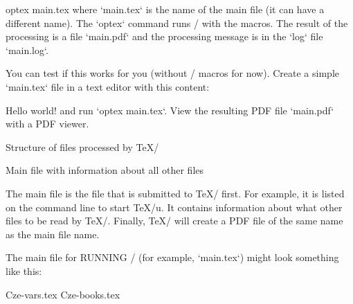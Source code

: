 \begtt
optex main.tex
\endtt
where `main.tex` is the name of the main file (it can have a different name). 
The `optex` command runs \LuaTeX/ with the \OpTeX macros. The result of the processing is a file 
`main.pdf` and the processing message is in the `log` file `main.log`.

You can test if this works for you (without \OpBible/ macros for now). Create a simple `main.tex` file in a text editor with this content:

\begtt
\fontfam[lm]
Hello world!
\bye
\endtt
and run `optex main.tex`. View the resulting PDF file `main.pdf` with a PDF viewer.


\sec Structure of files processed by \TeX/

\secc[main] Main file with information about all other files

The main file is the file that is submitted to \TeX/ first. For example, it is
listed on the command line to start \TeX/u. It contains information about what
other files to be read by \TeX/. Finally, \TeX/ will create a PDF file of the same
name as the main file name.

The main file for RUNNING \OpBible/ (for example, `main.tex`) might look something like this:

\begtt
\load[opbible] %
\enlang %

\def\tmark {BBE} %

 {Cze-vars.tex} %
 {Cze-books.tex} %

\def\txsfile {sources/Eng\tmark-\amark.txs} %
\def\fmtfile {formats/fmt-Eng\tmark-\amark.tex} %
\def\notesfile {notes/notes-\amark.tex} %
\def\introfile {others/intro-\amark.tex} %
\def\articlefile {others/articles-\amark.tex} %

\def\printedbooks {%
 Gen Exod Lev Num Deut Josh Judg Ruth 1Sam 2Sam 1Kgs 2Kgs 1Chr 2Chr Ezra Neh Esth Job Ps 
 Prov Eccl Song Isa Jer Lam Ezek Dan Hos Joel Amos Obad Jonah Mic Nah Hab Zeph Hag Zech Mal    
 Matt Mark Luke John Acts Rom 1Cor 2Cor Gal Eph Phil Col 1Thess 2Thess 1Tim 2Tim Titus  
 Phlm Heb Jas 1Pet 2Pet 1John 2John 3John Jude Rev
}

